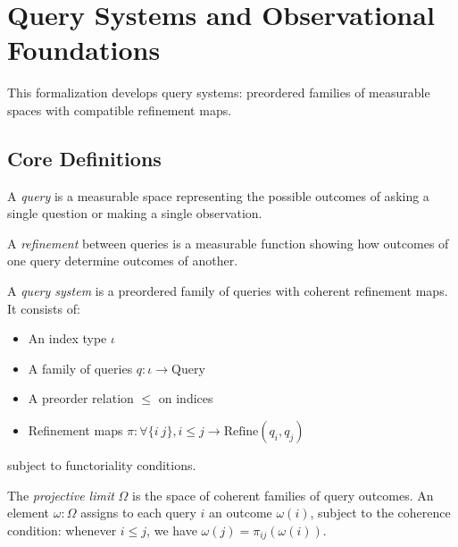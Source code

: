 \chapter{Query Systems and Observational Foundations}

This formalization develops query systems: preordered families of measurable spaces with compatible refinement maps.

\section{Core Definitions}

\begin{definition}
\label{def:query}
\leanok
A \emph{query} is a measurable space representing the possible outcomes of asking a single question or making a single observation.
\end{definition}

\begin{definition}
\label{def:refine}
\leanok
A \emph{refinement} between queries is a measurable function showing how outcomes of one query determine outcomes of another.
\end{definition}

\begin{definition}
\label{def:query-system}
\leanok
{}
A \emph{query system} is a preordered family of queries with coherent refinement maps. It consists of:
\begin{itemize}
\item An index type $\iota$
\item A family of queries $q : \iota \to \text{Query}$
\item A preorder relation $\le$ on indices
\item Refinement maps $\pi : \forall \{i\ j\}, i \le j \to \text{Refine}(q_i, q_j)$
\end{itemize}
subject to functoriality conditions.
\end{definition}

\begin{definition}
\label{def:omega}
\leanok
The \emph{projective limit} $\Omega$ is the space of coherent families of query outcomes.
An element $\omega : \Omega$ assigns to each query $i$ an outcome $\omega(i)$, subject to the coherence condition:
whenever $i \le j$, we have $\omega(j) = \pi_{ij}(\omega(i))$.
\end{definition}

